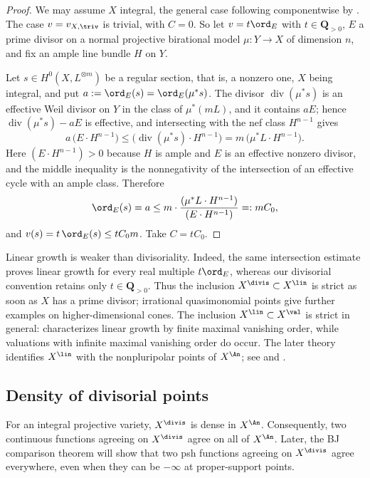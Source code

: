 \begin{proof}
We may assume $X$ integral, the general case following componentwise by
.  The case $v=v_{X,\triv}$ is trivial, with
$C=0$.  So let $v=t\ord_E$ with $t\in\mathbf Q_{>0}$, $E$ a prime
divisor on a normal projective birational model $\mu:Y\to X$ of dimension
$n$, and fix an ample line bundle $H$ on $Y$.

Let $s\in H^0(X,L^{\otimes m})$ be a regular section, that is, a nonzero
one, $X$ being integral, and put $a:=\ord_E(s)=\ord_E(\mu^*s)$.  The
divisor $\operatorname{div}(\mu^*s)$ is an effective Weil divisor on $Y$
in the class of $\mu^*(mL)$, and it contains $aE$; hence
$\operatorname{div}(\mu^*s)-aE$ is effective, and intersecting with the nef
class $H^{n-1}$ gives
\[
 a\,\bigl(E\cdot H^{n-1}\bigr)
 \leq\bigl(\operatorname{div}(\mu^*s)\cdot H^{n-1}\bigr)
 =m\,\bigl(\mu^*L\cdot H^{n-1}\bigr).
\]
Here $(E\cdot H^{n-1})>0$ because $H$ is ample and $E$ is an effective
nonzero divisor, and the middle inequality is the nonnegativity of the
intersection of an effective cycle with an ample class.  Therefore
\[
 \ord_E(s)=a\leq m\cdot
 \frac{(\mu^*L\cdot H^{n-1})}{(E\cdot H^{n-1})}=:mC_0 ,
\]
and $v(s)=t\,\ord_E(s)\leq tC_0m$.  Take $C=tC_0$.
\end{proof}

\begin{remark}
\label{rem:ch32-linear-growth-converse}
Linear growth is weaker than divisoriality.  Indeed, the same intersection
estimate proves linear growth for every real multiple $t\ord_E$, whereas
our divisorial convention retains only $t\in\mathbf Q_{>0}$.  Thus the
inclusion $X^{\divis}\subset X^{\lin}$ is strict as soon as $X$ has a
prime divisor; irrational quasimonomial points give further examples on
higher-dimensional cones.  The inclusion $X^{\lin}\subset X^{\val}$ is
strict in general:  characterizes linear growth by finite
maximal vanishing order, while valuations with infinite
maximal vanishing order do occur.  The later theory identifies
$X^{\lin}$ with the nonpluripolar points of $X^{\An}$; see
 and .
\end{remark}

\subsection{Density of divisorial points}
\label{sec:ch32-density}

\begin{theorem}\label{thm:triv-divisorial-density}
For an integral projective variety, $X^{\divis}$ is dense in $X^{\An}$.
Consequently, two continuous functions agreeing on $X^{\divis}$ agree on
all of $X^{\An}$.  Later, the BJ comparison theorem will show that two psh
functions agreeing on $X^{\divis}$ agree everywhere, even when they can be
$-\infty$ at proper-support points.
\end{theorem}

